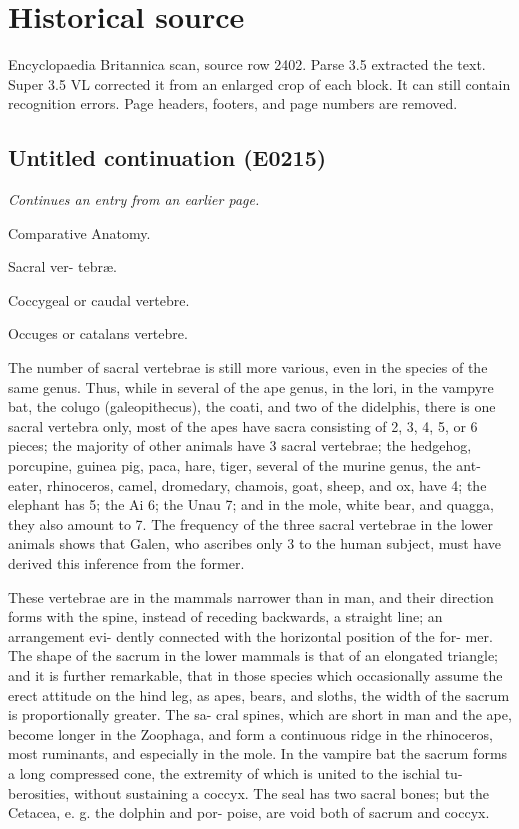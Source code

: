 \documentclass{article}
\begin{document}
\section*{Historical source}
Encyclopaedia Britannica scan, source row 2402. Parse 3.5 extracted the text. Super 3.5 VL corrected it from an enlarged crop of each block. It can still contain recognition errors.
Page headers, footers, and page numbers are removed.

\subsection*{Untitled continuation (E0215)}
\textit{Continues an entry from an earlier page.}

Comparative Anatomy.

Sacral ver-
tebræ.

Coccygeal
or caudal
vertebre.

Occuges
or catalans
vertebre.

The number of sacral vertebrae is still more various, even in the species of the same genus. Thus, while in several of the ape genus, in the lori, in the vampyre bat, the colugo (galeopithecus), the coati, and two of the didelphis, there is one sacral vertebra only, most of the apes have sacra consisting of 2, 3, 4, 5, or 6 pieces; the majority of other animals have 3 sacral vertebrae; the hedgehog, porcupine, guinea pig, paca, hare, tiger, several of the murine genus, the ant-eater, rhinoceros, camel, dromedary, chamois, goat, sheep, and ox, have 4; the elephant has 5; the Ai 6; the Unau 7; and in the mole, white bear, and quagga, they also amount to 7. The frequency of the three sacral vertebrae in the lower animals shows that Galen, who ascribes only 3 to the human subject, must have derived this inference from the former.

These vertebrae are in the mammals narrower than in
man, and their direction forms with the spine, instead of
receding backwards, a straight line; an arrangement evi-
dently connected with the horizontal position of the for-
mer. The shape of the sacrum in the lower mammals is
that of an elongated triangle; and it is further remarkable,
that in those species which occasionally assume the erect
attitude on the hind leg, as apes, bears, and sloths, the
width of the sacrum is proportionally greater. The sa-
cral spines, which are short in man and the ape, become
longer in the Zoophaga, and form a continuous ridge in the
rhinoceros, most ruminants, and especially in the mole. In
the vampire bat the sacrum forms a long compressed
cone, the extremity of which is united to the ischial tu-
berosities, without sustaining a coccyx. The seal has two
sacral bones; but the Cetacea, e. g. the dolphin and por-
poise, are void both of sacrum and coccyx.
\end{document}
